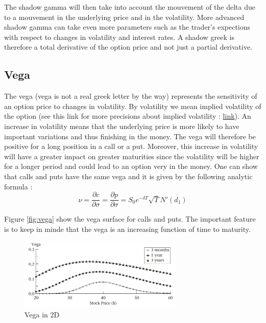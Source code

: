 \documentclass[hidelinks]{article}
\begin{document}
    The shadow gamma will then take into account the mouvement of the delta due to a mouvement in the underlying price and in the volatility. More advanced shadow gamma can take even more parameters such as the trader's expections with respect to changes in volatility and interest rates.
    A shadow greek is therefore a total derivative of the option price and not just a partial derivative.
    \newpage
    \subsection{Vega}
    
    The vega (vega is not a real greek letter by the way) represents the sensitivity of an option price to changes in volatility. By volatility we mean implied volatility of the option (see this link for more precisions about implied volatility : \href{https://www.investopedia.com/terms/i/iv.asp}{link}). An increase in volatility means that the underlying price is more likely to have important variations and thus finishing in the money. The vega will therefore be positive for a long position in a call or a put. Moreover, this increase in volatility will have a greater impact on greater maturities since the volatility will be higher for a longer period and could lead to an option very in the money. One can show that calls and puts have the same vega and it is given by the following analytic formula :
    $$\nu =\frac{\partial c}{\partial \sigma} =\frac{\partial p}{\partial \sigma}= S_0  e^{-\delta T} \sqrt{T} N'(d_1)$$
    
    Figure \ref{fig:vega} show the vega surface for calls and puts. The important feature is to keep in minde that the vega is an increasing function of time to maturity.
    
    \begin{figure}[!h]
	\centering
	
	\includegraphics[width=0.7\textwidth]{vega_2d.png}
	
	\caption{Vega in 2D}
	\label{fig:vega2d}
	\end{figure}
    
\end{document}
